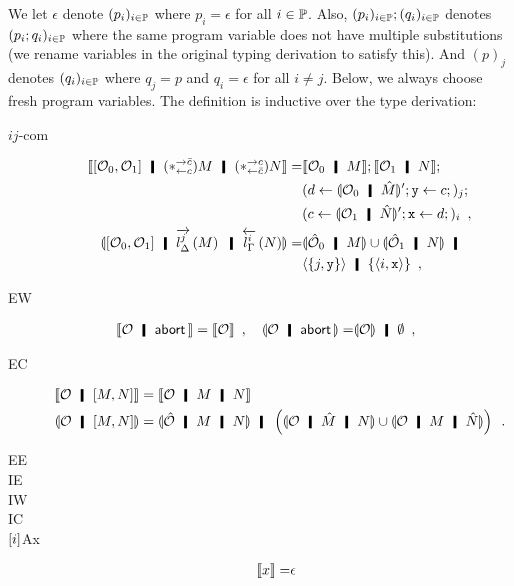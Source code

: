 {We let $\epsilon$ denote $(p_i)_{i\in\mathbb{P}}$ where $p_i=\epsilon$
for all $i\in\mathbb{P}$.
Also, $(p_i)_{i\in\mathbb{P}}; (q_i)_{i\in\mathbb{P}}$ denotes
$(p_i; q_i)_{i\in\mathbb{P}}$ where the
same program variable does not have multiple substitutions
(we rename variables in the original typing derivation to satisfy this).
And $(p)_j$ denotes $(q_i)_{i\in\mathbb{P}}$ where $q_j = p$ and $q_i =
\epsilon$ for all $i\neq j$.
Below, we always choose fresh program variables.
The definition is inductive over the type derivation:
\begin{description}
 \item[$ij$-com]
      \begin{align*}
 \semo{\cotuple{\hypert_0,\hypert_1}\hmid (\comodL) M\hmid (\comodR) N}
 =& \semo{\hypert_0\hmid M};
 \semo{\hypert_1\hmid N};\\
 &(d\leftarrow \semoi{\hypert_0\hmid\hat M}'; \p
 y\leftarrow c;)_j; \\
 &(c\leftarrow \semoi{\hypert_1\hmid\hat N}'; \p
 x\leftarrow d;)_i\enspace,\\
 \semoi{\cotuple{\hypert_0,\hypert_1}\hmid\ltor j l \Delta M\hmid \rtol i l\Gamma N} =&
 \semoi{\hat \hypert_0\hmid M} \cup \semoi{\hat \hypert_1\hmid N} \hmid\\& \tuple{\{j,\p
 y\}}\hmid \{\tuple{i,\p x}\}\enspace,
      \end{align*}
 \item[EW] \begin{align*}
 \semo{\hypert\hmid \abort}=\semo{\hypert}\enspace,\quad
 \semoi{\hypert\hmid\abort}=&\semoi{\hypert}\hmid \emptyset\enspace,\quad
	   \end{align*}
 \item[EC] 
\begin{align*}
 \semo{\hypert\hmid \cotuple{M,N}}&= \semo{\hypert\hmid M \hmid N}\\
 \semoi{\hypert\hmid \cotuple{M,N}}&= \semoi{\hat\hypert\hmid M\hmid N}
 \hmid
 \left(\semoi{\hypert\hmid\hat M\hmid N} \cup \semoi{\hypert\hmid M\hmid
 \hat N}\right)\enspace.
\end{align*}
 \item[EE] 
 \item[IE] 
 \item[IW] 
 \item[IC] 
 \item[$\lbrack {i}\rbrack$Ax] 
\begin{align*}
 \semo{x}=& \epsilon \enspace\\

\end{align*}
\end{description}}
